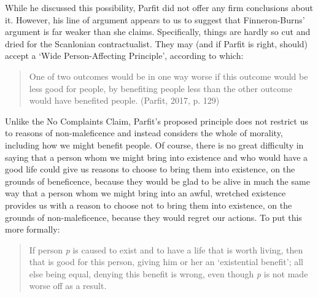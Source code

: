\documentclass[man,11pt,a4paper]{apa7}
\begin{document}
While he discussed this possibility, Parfit did not offer any firm conclusions about it. However, his line of argument appears to us to suggest that Finneron-Burns' argument is far weaker than she claims. Specifically, things are hardly so cut and dried for the Scanlonian contractualist. They may (and if Parfit is right, should) accept a `Wide Person-Affecting Principle', according to which:

\begin{quote}
One of two outcomes would be in one way worse if this outcome would be less good for people, by benefiting people less than the other outcome would have benefited people. (Parfit, 2017, p. 129)
\end{quote}

Unlike the No Complaints Claim, Parfit's proposed principle does not restrict us to reasons of non-maleficence and instead considers the whole of morality, including how we might benefit people. Of course, there is no great difficulty in saying that a person whom we might bring into existence and who would have a good life could give us reasons to choose to bring them into existence, on the grounds of beneficence, because they would be glad to be alive in much the same way that a person whom we might bring into an awful, wretched existence provides us with a reason to choose not to bring them into existence, on the grounds of non-maleficence, because they would regret our actions. To put this more formally:

\begin{quote}
If person \textit{p} is caused to exist and to have a life that is worth living, then that is good for this person, giving him or her an `existential benefit'; all else being equal, denying this benefit is wrong, even though \textit{p} is not made worse off as a result.
\end{quote}
\end{document}
